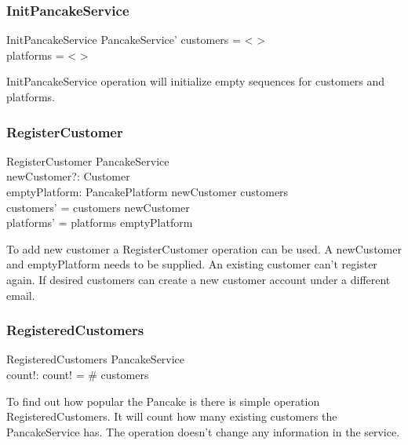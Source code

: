\documentclass{article}
\begin{document}
\label{toc:InitPancakeService}
\subsubsection{InitPancakeService}
\begin{schema}{InitPancakeService}
  PancakeService'
\where
 customers = < > \\
 platforms = < >
\end{schema}
InitPancakeService operation will initialize empty sequences for customers and platforms.

\label{toc:RegisterCustomer}
\subsubsection{RegisterCustomer}
\begin{schema}{RegisterCustomer}
  \Delta PancakeService \\
  newCustomer?: Customer \\
  emptyPlatform: PancakePlatform
\where
  newCustomer \notin customers \\
  customers' = customers \cup newCustomer \\
  platforms' = platforms \cup emptyPlatform 
\end{schema}
To add new customer a RegisterCustomer operation can be used. A newCustomer and emptyPlatform needs to be supplied. An existing customer can't register again. If desired customers can create a new customer account under a different email.


\label{toc:RegisteredCustomers}
\subsubsection{RegisteredCustomers}
\begin{schema}{RegisteredCustomers}
  \Xi PancakeService \\
  count!: \nat
\where
  count! = \# \dom customers
\end{schema}
To find out how popular the Pancake is there is simple operation RegisteredCustomers. It will count how many existing customers the PancakeService has. The operation doesn't change any information in the service.

\newpage
\label{toc:LoginCustomer}
\end{document}
